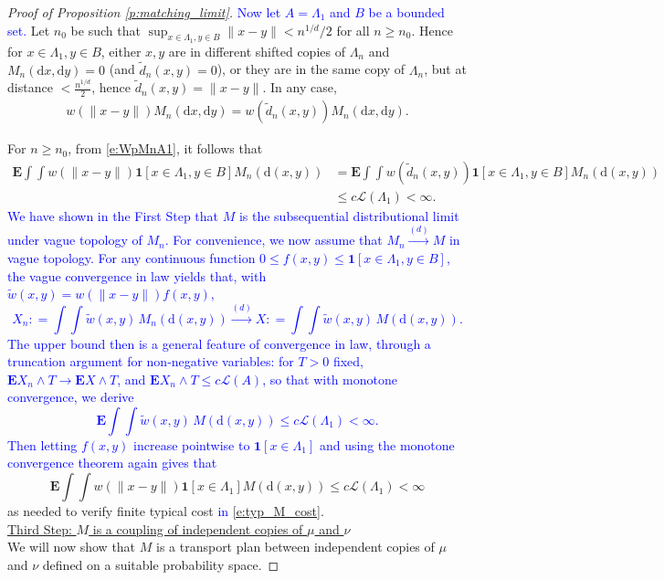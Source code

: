 \documentclass[12pt]{article}
\newcommand{\Leb}{\mathcal{L}}
\newcommand{\convlaw}{\stackrel{(d)}{\to}}
\newcommand{\1}{\mathbf{1}}
\newcommand{\md}{\mathrm{d}}
\newcommand{\E}{\mathbf  E}
\newcommand{\RL}[1]{\textcolor{blue}{#1}}
\newcommand{\dy}[1]{\textcolor{blue}{#1}}
\newcommand{\RL}[1]{#1}%
\newcommand{\dy}[1]{#1}%
\begin{document}
{{{{{\begin{proof}[Proof of Proposition \ref{p:matching_limit}]
\dy{Now let $A = \Lambda_1$ and $B$ be a bounded set.} Let $ n_{0}$ be such that $ \sup_{x\in \Lambda_1,y\in B}\|x-y\|<n^{1/d}/2$ {for all $n \geqslant  n_0$}. Hence for $x \in \Lambda_1,y\in B$, either $ x,y$ are in different shifted copies of $\Lambda_n$ and $ M_{n}(\md x,\md y)= 0$ (and $\tilde d_{n}(x,y) = 0$), or they are in the same copy of $\Lambda_n$, but at distance $ < \frac{n^{1/d}}{2}$, hence $\tilde d_{n}(x,y)= \|x-y\|.$ In any case,
%
\begin{align*}
w(\|x-y\|)M_{n}(\md x,\md y)= w(\tilde d_{n}(x,y)) M_{n}(\md x,\md y).
\end{align*}
%

{For $ n\geqslant n_{0}$, from \eqref{e:WpMnA1}, it follows that}
%
\begin{align*}
\mathbf{E} \int \int w(\|x-y\|)\1[x \in \Lambda_1, y \in B] M_n(\md (x,y)) & = \E \int \int w(\tilde d_{n}(x,y))\1[x \in \Lambda_1, y \in B] M_n(\md (x,y)) \\
& \leqslant c \Leb(\Lambda_1) < \infty.
\end{align*}
%
\dy{We have shown in the First Step that $M$ is the subsequential distributional limit under vague topology of $M_n$. For convenience, we now assume that $M_n \convlaw M$ in vague topology.} \RL{For any continuous function $0\leqslant  f(x,y)\leqslant \1[x\in \Lambda_1,y\in B]$, the vague convergence in law yields that, with $ \tilde w(x,y) = w(\|x-y\|)f(x,y)$, 
%
$$X_{ n}: =  \int \int \tilde{w}(x,y) \, M_n(\md (x,y)) \convlaw X: =  \int \int \tilde{w}(x,y) \, M(\md (x, y)).$$
%
\RL{The upper bound then is a general feature of  convergence in law, through  a truncation argument for non-negative variables: for $ T>0$ fixed, $ \mathbf E X_{ n}\wedge T\to \mathbf E X \wedge T$, and $ \mathbf E X_{ n}\wedge T\leqslant c\Leb(A)$, so that with monotone convergence, we derive
%
$$\mathbf E  \int \int \tilde{w}(x,y) \, M(\md (x, y)) \leqslant c\Leb(\Lambda_1) < \infty.$$ 
}
 Then letting $ f(x,y)$ increase pointwise to $\1[x\in \Lambda_1]$ and using the monotone convergence theorem again  gives that}
%
$$ \E \int \int w(\|x-y\|) \1[x \in \Lambda_1 ] M(\md (x,y))  \leqslant c \Leb(\Lambda_1) < \infty$$ 
%
  as  {needed to verify finite typical cost \dy{in \eqref{e:typ_M_cost}}.} \\



 \underline {Third Step: $ M$ is a coupling of independent copies of $\mu$ and $\nu$}  \\
We will now show that $M$ is a transport plan between {independent copies of}  $\mu$ and $\nu $ defined  on a suitable probability space. %


\end{proof}}}}}}
\end{document}
